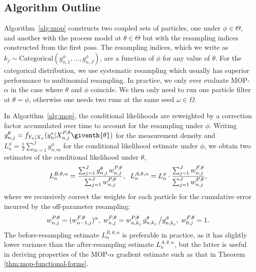 \documentclass[numsec,webpdf,modern,medium,namedate]{oup-authoring-template}
\newcommand\arxiv[2]{#2} %
\theoremstyle{thmstyleone}%
\theoremstyle{thmstyletwo}%
\theoremstyle{thmstylethree}%
\begin{document}
\arxiv{}{\vspace*{-2mm}}
\subsection{Algorithm Outline} 

Algorithm~\ref{alg:mop} constructs two coupled sets of particles, one under $\phi \in \Theta$, and another with the process model at $\theta \in \Theta$ but with the resampling indices constructed from the first pass.
The resampling indices, which we write as $k_j \sim \text{Categorical}(g^{\phi}_{n,1},...,g^{\phi}_{n,J})$, are a function of $\phi$ for any value of $\theta$.
For the categorical distribution, we use systematic resampling \citep{arulampalam02,king16} which usually has superior performance to multinomial resampling.
In practice, we only ever evaluate MOP-$\alpha$ in the case where $\theta$ and $\phi$ coincide. We then only need to run one particle filter at $\theta=\phi$, otherwise one needs two runs at the same seed $\omega \in \Omega$.

In Algorithm~\ref{alg:mop}, the conditional likelihoods are reweighted by a correction factor accumulated over time to account for the resampling under $\phi$. 
Writing $g^{\theta}_{n,j}={f}_{{Y}_{n}|{X}_{n}}(y_{n}^{*}|{X}_{n,j}^{P,\theta}\giventh{\theta})$ for the measurement density and $L_n^{\phi} = \frac{1}{J}\sum_{m=1}^{J}g^{\phi}_{n,m}$ for the conditional likelihood estimate under $\phi$, we obtain two estimates of the conditional likelihood under $\theta$,
\arxiv{}{\vspace*{-1.5mm}}
\begin{equation}
     \label{eq:mop-conditional-likelihood}
     L_n^{B,\theta,\alpha} = \frac{\sum_{j=1}^Jg^\theta_{n,j}\, w^{P,\theta}_{n,j}}{\sum_{j=1}^J  w^{P,\theta}_{n,j}}, \arxiv{\hspace{15mm}}{\;\;}
     L_n^{A,\theta,\alpha} = L_n^\phi\cdot \frac{\sum_{j=1}^J w^{F,\theta}_{n,j}}{\sum_{j=1}^J  w^{P,\theta}_{n,j}},
     \arxiv{}{\vspace*{-1.5mm}}
\end{equation}
where we recursively correct the weights for each particle for the cumulative error incurred by the off-parameter resampling:
\arxiv{}{\vspace*{-2mm}}
\begin{equation}
    \label{eq:weighting-scheme}
    w_{n,j}^{P,\theta} = (w_{n-1,j}^{F,\theta})^\alpha, 
    \arxiv{\hspace{5mm}}{\;}
    w^{F,\theta}_{n,j} = w^{P,\theta}_{n,k_j} \, g^{\theta}_{n,k_j} \, \big/ g^{\phi}_{n,k_j}, 
    \arxiv{\hspace{5mm}}{\;}
    w^{F,\theta}_{0,j}= 1.
    \arxiv{}{\vspace*{-1.5mm}}
\end{equation}
The before-resampling estimate $L_n^{B,\theta,\alpha}$ is preferable in practice, as it has slightly lower variance than the after-resampling estimate $L_n^{A,\theta,\alpha}$, but the latter is useful in deriving properties of the MOP-$\alpha$ gradient estimate such as that in Theorem \ref{thm:mop-functional-forms}.
\end{document}
